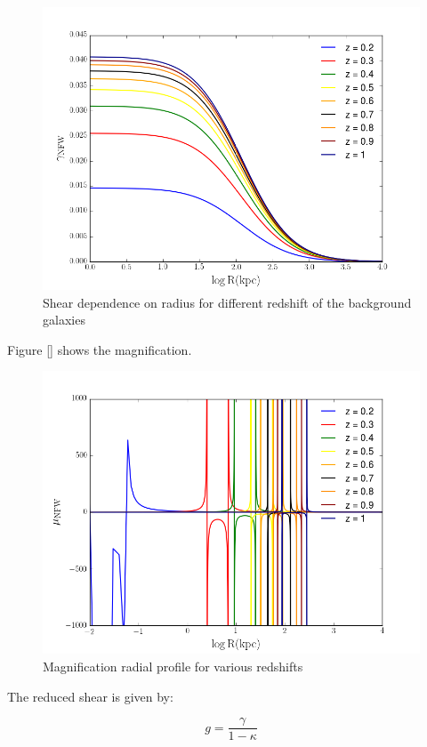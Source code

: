\begin{figure}[H]
\centering
\includegraphics[width=12cm]{images/Shear_vs_rad.png}
\caption[Shear dependence on radius]{Shear dependence on radius for different redshift of the background galaxies}
\end{figure}

Figure [] shows the magnification.

\begin{figure}[H]
\centering
\includegraphics[width=12cm]{images/Magnification.png}
\caption[Magnification radial profile]{Magnification radial profile for various redshifts}
\end{figure}

The reduced shear is given by:

\begin{equation}
g=\frac{\gamma}{1-\kappa}
\end{equation}

